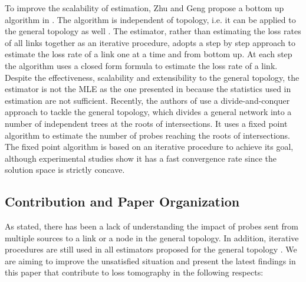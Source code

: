 \documentclass[10pt,twocolumn]{IEEEtran}
\begin{document}
To improve the scalability of estimation, Zhu and Geng propose a
bottom up algorithm in \cite{ZG04-3}. The algorithm is independent of
topology, i.e. it can be applied to the general topology as well
\cite{ZG05}. The estimator, rather than estimating the loss rates of
all links together as an iterative procedure, adopts a step by step
approach to estimate the loss rate of a link one at a time and from
bottom up. At each step the algorithm uses a closed form formula to
estimate the loss rate of a link. Despite the effectiveness,
scalability and extensibility to the general topology,
 the estimator is not the MLE as the one presented in \cite{DHPT06}
 because the statistics used in estimation are not sufficient.
 Recently, the authors of \cite{ZD09} use a divide-and-conquer approach to tackle the general
 topology,
 which divides a general network into a number of independent trees at the roots of intersections. It uses a fixed point algorithm to
 estimate the number of probes reaching the roots of intersections. The fixed point algorithm
 is based on an iterative procedure to achieve its goal, although experimental studies show
 it has a fast convergence rate since the solution space is strictly
concave.

\subsection{Contribution and Paper Organization}
As stated,  there has been a lack of understanding the impact of
probes sent from multiple sources to a link or a node in the general
topology. In addition, iterative procedures are still used in all
estimators proposed for the general topology \cite{ZD09}. We are
aiming to improve the unsatisfied situation and present the latest
findings in this paper that contribute to loss tomography in the
following respects:
\end{document}
